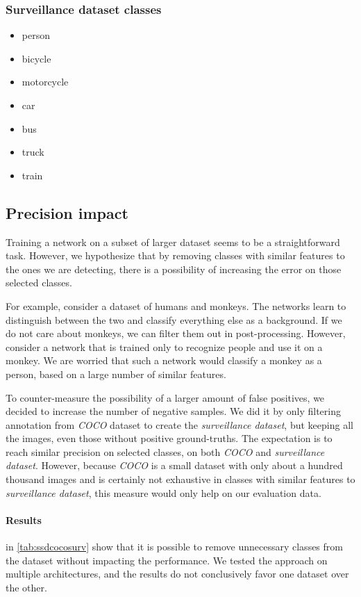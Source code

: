 \subsubsection{Surveillance dataset classes}
\begin{multicols}{2}
    \begin{itemize}
        \item person
        \item bicycle
        \item motorcycle
        \item car
        \item bus
        \item truck
        \item train
    \end{itemize}
\end{multicols}

\subsection{Precision impact}
Training a network on a subset of larger dataset seems to be a straightforward task. However, we hypothesize that by removing classes with similar features to the ones we are detecting, there is a possibility of increasing the error on those selected classes. 

For example, consider a dataset of humans and monkeys. The networks learn to distinguish between the two and classify everything else as a background. If we do not care about monkeys, we can filter them out in post-processing. However, consider a network that is trained only to recognize people and use it on a monkey. We are worried that such a network would classify a monkey as a person, based on a large number of similar features. 

To counter-measure the possibility of a larger amount of false positives, we decided to increase the number of negative samples. We did it by only filtering annotation from \textit{COCO} dataset to create the \textit{surveillance dataset}, but keeping all the images, even those without positive ground-truths. The expectation is to reach similar precision on selected classes, on both \textit{COCO} and \textit{surveillance dataset}. However, because \textit{COCO} is a small dataset with only about a hundred thousand images and is certainly not exhaustive in classes with similar features to \textit{surveillance dataset}, this measure would only help on our evaluation data.

\paragraph{Results} in \cref{tab:ssdcocosurv} show that it is possible to remove unnecessary classes from the dataset without impacting the performance. We tested the approach on multiple architectures, and the results do not conclusively favor one dataset over the other. 

